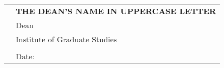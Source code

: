\null\vspace{2cm}
\noindent
\begin{tabular}{@{}p{}p{}}
                            & \textbf{THE DEAN'S NAME IN UPPERCASE LETTER}\\
                            & Dean\\
                            & Institute of Graduate Studies\\
                            & \makeatletter {\@university} \makeatother\\
                            & Date: \makeatletter {\@datesubmit} \makeatother\\
\end{tabular}

